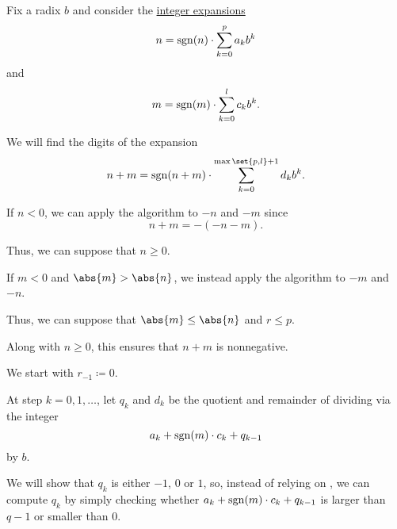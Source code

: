 \begin{algorithm}\label{alg:addition_with_carrying}
  Fix a radix \( b \) and consider the \hyperref[def:integer_radix_expansion]{integer expansions}
  \begin{equation*}
    n = \operatorname{sgn}(n) \cdot \sum_{k=0}^p a_k b^k
  \end{equation*}
  and
  \begin{equation*}
    m = \operatorname{sgn}(m) \cdot \sum_{k=0}^l c_k b^k.
  \end{equation*}

  We will find the digits of the expansion
  \begin{equation*}
    n + m = \sgn(n + m) \cdot \sum_{k=0}^{\max\set{ p, l } + 1} d_k b^k.
  \end{equation*}

  \begin{thmenum}
     If \( n < 0 \), we can apply the algorithm to \( -n \) and \( -m \) since
    \begin{equation*}
      n + m = -(-n - m).
    \end{equation*}

    Thus, we can suppose that \( n \geq 0 \).

     If \( m < 0 \) and \( \abs{m} > \abs{n} \), we instead apply the algorithm to \( -m \) and \( -n \).

    Thus, we can suppose that \( \abs{m} \leq \abs{n} \) and \( r \leq p \).

    Along with \( n \geq 0 \), this ensures that \( n + m \) is nonnegative.

     We start with \( r_{-1} \coloneqq 0 \).

     At step \( k = 0, 1, \ldots \), let \( q_k \) and \( d_k \) be the quotient and remainder of dividing via  the integer
    \begin{equation}\label{eq:alg:addition_with_carrying/step/quot}
      a_k + \operatorname{sgn}(m) \cdot c_k + q_{k - 1}
    \end{equation}
    by \( b \).

    We will show that \( q_k \) is either \( -1 \), \( 0 \) or \( 1 \), so, instead of relying on , we can compute \( q_k \) by simply checking whether \( a_k + \operatorname{sgn}(m) \cdot c_k + q_{k - 1} \) is larger than \( q - 1 \) or smaller than \( 0 \).
  \end{thmenum}
\end{algorithm}
